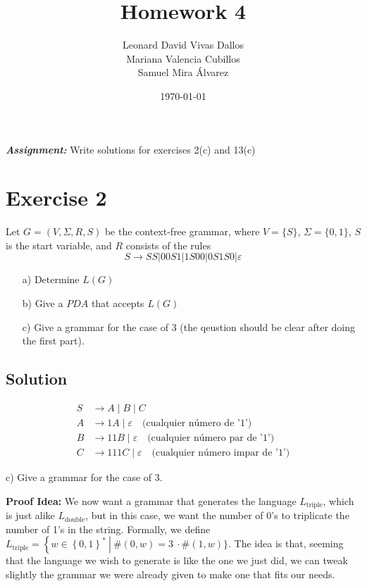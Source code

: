 \documentclass[12pt]{article}
\title{Homework 4}
\author{Leonard David Vivas Dallos \\ Mariana Valencia Cubillos \\ Samuel Mira Álvarez}
\date{\today}
\begin{document}
\maketitle
\textbf{\textit{Assignment:}} Write solutions for exercises 2(c) and 13(c)

\tableofcontents

\renewcommand{\thesubsection}{\thesection.\alph{subsection}}

\setcounter{section}{1}

\section{Exercise 2}

\setcounter{subsection}{2}

Let $G = (V, \Sigma, R, S)$ be the context-free grammar, where $V = \{S\}$, $\Sigma = \{0, 1\}$, $S$ is the start variable, and $R$ consists of the rules
\begin{equation*}
    S \rightarrow SS | 00S1 | 1S00 | 0S1S0 | \varepsilon
\end{equation*}

\begin{enumerate}
    \item[a)] Determine $L(G)$
    \item[b)] Give a $PDA$ that accepts $L(G)$
    \item[c)] Give a grammar for the case of $3$ (the qeustion should be clear after doing the first part).
\end{enumerate}

\subsection{Solution}

\begin{align*}
S &\rightarrow A \mid B \mid C \\
A &\rightarrow 1A \mid \varepsilon \quad \text{(cualquier número de '1')} \\
B &\rightarrow 11B \mid \varepsilon \quad \text{(cualquier número par de '1')} \\
C &\rightarrow 111C \mid \varepsilon \quad \text{(cualquier número impar de '1')}
\end{align*}

c) Give a grammar for the case of 3.
\vspace{5pt}

\textbf{Proof Idea:} We now want a grammar that generates the language
\(L_{\text{triple}}\), which is just alike \(L_{\text{double}}\), but in
this case, we want the number of 0's to triplicate the number of 1's in
the string. Formally, we define
\(L_{\text{triple}} = \left\{ w \in \left\{ 0,1 \right\}^{*}\  \right|\ \#(0,w) = 3\  \cdot \#(1,w)\}\).
The idea is that, seeming that the language we wish to generate is like
the one we just did, we can tweak slightly the grammar we were already
given to make one that fits our needs.
\end{document}
